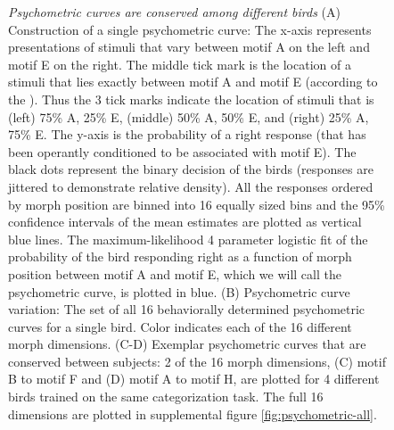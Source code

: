 \begin{figure}[tp]
  \caption[Psychometric curves are conserved among different birds]{
  \emph{Psychometric curves are conserved among different birds}
(A)	Construction of a single psychometric curve: The x-axis represents presentations of stimuli that vary between motif A on the left and motif E on the right. The middle tick mark is the location of a stimuli that lies exactly between motif A and motif E (according to the \DBN). Thus the 3 tick marks indicate the location of stimuli that is (left) 75\% A, 25\% E, (middle) 50\% A, 50\% E, and (right) 25\% A, 75\% E. The y-axis is the probability of a right response (that has been operantly conditioned to be associated with motif E). The black dots represent the binary decision of the birds (responses are jittered to demonstrate relative density). All the responses ordered by morph position are binned into 16 equally sized bins and the 95\% confidence intervals of the mean estimates are plotted as vertical blue lines. The maximum-likelihood 4 parameter logistic fit of the probability of the bird responding right as a function of morph position between motif A and motif E, which we will call the psychometric curve, is plotted in blue.
(B)	Psychometric curve variation: The set of all 16 behaviorally determined psychometric curves for a single bird. Color indicates each of the 16 different morph dimensions.
(C-D)	Exemplar psychometric curves that are conserved between subjects: 2 of the 16 morph dimensions, (C) motif B to motif F and (D) motif A to motif H, are plotted for 4 different birds trained on the same categorization task. The full 16 dimensions are plotted in supplemental figure \ref{fig:psychometric-all}.
}
\end{figure}
